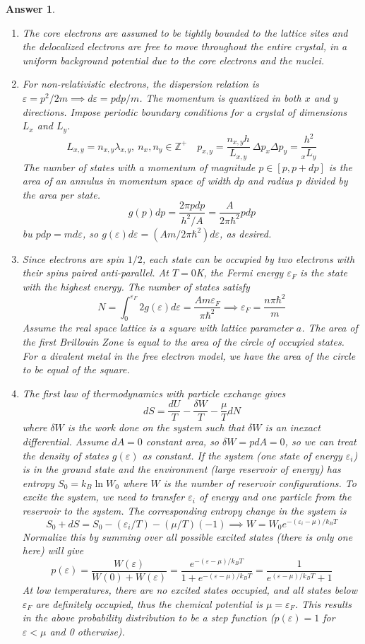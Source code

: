 \documentclass[a4paper]{article}
\newtheorem{ans}{Answer}[subsection]
\theoremstyle{new}
\begin{document}
\begin{ans}\leavevmode
\begin{enumerate}[label=(\roman*)]
\item The core electrons are assumed to be tightly bounded to the lattice sites and the delocalized electrons are free to move throughout the entire crystal, in  a uniform background potential due to the core electrons and the nuclei. 
\item For non-relativistic electrons, the dispersion relation is $\varepsilon=p^2/2m\implies d\varepsilon=pdp/m$. The momentum is quantized in both $x$ and $y$ directions. Impose periodic boundary conditions for a crystal of dimensions $L_x$ and $L_y$. 
$$L_{x,y}=n_{x,y}\lambda_{x,y},~n_x,n_y\in\mathbb{Z}^+\quad p_{x,y}=\frac{n_{x,y}h}{L_{x,y}}~\Delta p_x\Delta p_y=\frac{h^2}{_xL_y}$$
The number of states with a momentum of magnitude $p\in[p,p+dp]$ is the area of an annulus in momentum space of width $dp$ and radius $p$ divided by the area per state.
$$g(p)dp=\frac{2\pi pdp}{h^2/A}=\frac{A}{2\pi\hbar^2}pdp$$
bu $pdp=md\varepsilon$, so $g(\varepsilon)d\varepsilon=(Am/2\pi\hbar^2)d\varepsilon$, as desired.
\item Since electrons are spin $1/2$, each state can be occupied by two electrons with their spins paired anti-parallel. At $T=0$K, the Fermi energy $\varepsilon_F$ is the state with the highest energy. The number of states satisfy
$$N=\int_0^{\varepsilon_F}2g(\varepsilon)d\varepsilon=\frac{Am\varepsilon_F}{\pi\hbar^2}\implies\varepsilon_F=\frac{n\pi\hbar^2}{m}$$
Assume the real space lattice is a square with lattice parameter $a$. The area of the first Brillouin Zone is equal to the area of the circle of occupied states. For a divalent metal in the free electron model, we have the area of the circle to be equal of the square.
\item The first law of thermodynamics with particle exchange gives
$$dS=\frac{dU}{T}-\frac{\delta W}{T}-\frac{\mu}{T}dN$$
where $\delta W$ is the work done on the system such that $\delta W$ is an inexact differential. Assume $dA=0$ constant area, so $\delta W=pdA=0$, so we can treat the density of states $g(\varepsilon)$ as constant. If the system (one state of energy $\varepsilon_i$) is in the ground state and the environment (large reservoir of energy) has entropy $S_0=k_B\ln W_0$ where $W$ is the number of reservoir configurations. To excite the system, we need to transfer $\varepsilon_i$ of energy and one particle from the reservoir to the system. The corresponding entropy change in the system is
$$S_0+dS=S_0-(\varepsilon_i/T)-(\mu/T)(-1)\implies W=W_0e^{-(\varepsilon_i-\mu)/k_BT}$$
Normalize this by summing over all possible excited states (there is only one here) will give
$$p(\varepsilon)=\frac{W(\varepsilon)}{W(0)+W(\varepsilon)}=\frac{e^{-(\varepsilon-\mu)/k_BT}}{1+e^{-(\varepsilon-\mu)/k_BT}}=\frac{1}{e^{(\varepsilon-\mu)/k_BT}+1}$$
At low temperatures, there are no excited states occupied, and all states below $\varepsilon_F$ are definitely occupied, thus the chemical potential is $\mu=\varepsilon_F$. This results in the above probability distribution to be a step function ($p(\varepsilon)=1$ for $\varepsilon<\mu$ and 0 otherwise).
\end{enumerate}
\end{ans}
\end{document}
